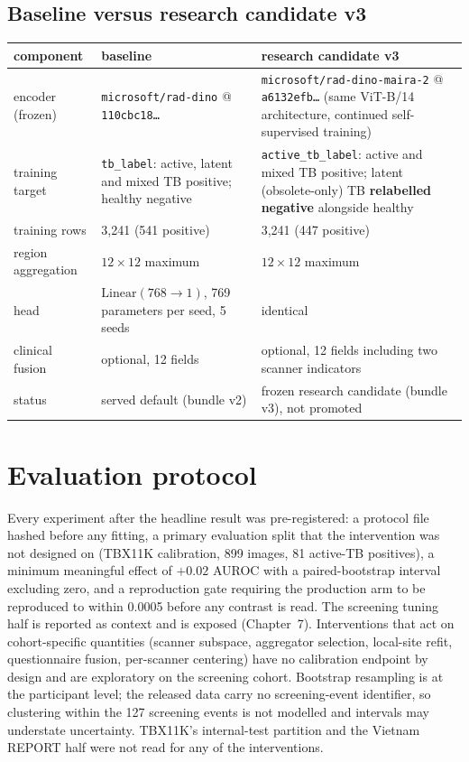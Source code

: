 \documentclass[12pt,a4paper]{report}
\newcommand{\code}[1]{\texttt{#1}}
\begin{document}
\subsection{Baseline versus research candidate v3}
\begin{tabularx}{\textwidth}{@{}lLL@{}}\toprule
component & baseline & research candidate v3\\\midrule
encoder (frozen) & \code{microsoft/rad-dino} @ \code{110cbc18\ldots} & \code{microsoft/rad-dino-maira-2} @ \code{a6132efb\ldots} (same ViT-B/14 architecture, continued self-supervised training)\\
training target & \code{tb\_label}: active, latent and mixed TB positive; healthy negative & \code{active\_tb\_label}: active and mixed TB positive; latent (obsolete-only) TB \textbf{relabelled negative} alongside healthy\\
training rows & 3,241 (541 positive) & 3,241 (447 positive)\\
region aggregation & $12\times12$ maximum & $12\times12$ maximum\\
head & $\mathrm{Linear}(768\to1)$, 769 parameters per seed, 5 seeds & identical\\
clinical fusion & optional, 12 fields & optional, 12 fields including two scanner indicators\\
status & served default (bundle v2) & frozen research candidate (bundle v3), not promoted\\\bottomrule
\end{tabularx}

\section{Evaluation protocol}
Every experiment after the headline result was pre-registered: a protocol file hashed before any fitting, a primary evaluation split that the intervention was not designed on (TBX11K calibration, 899 images, 81 active-TB positives), a minimum meaningful effect of $+0.02$ AUROC with a paired-bootstrap interval excluding zero, and a reproduction gate requiring the production arm to be reproduced to within 0.0005 before any contrast is read. The screening tuning half is reported as context and is exposed (Chapter~7). Interventions that act on cohort-specific quantities (scanner subspace, aggregator selection, local-site refit, questionnaire fusion, per-scanner centering) have no calibration endpoint by design and are exploratory on the screening cohort. Bootstrap resampling is at the participant level; the released data carry no screening-event identifier, so clustering within the 127 screening events is not modelled and intervals may understate uncertainty. TBX11K's internal-test partition and the Vietnam REPORT half were not read for any of the interventions.
\end{document}
